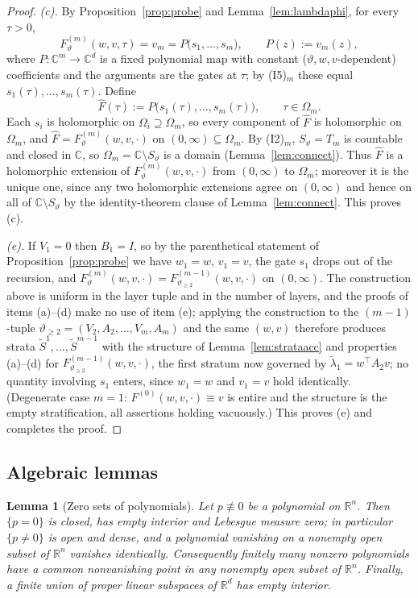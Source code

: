 \documentclass[11pt]{article}
\newtheorem{lemma}[theorem]{Lemma}
\theoremstyle{definition}
\theoremstyle{remark}
\theoremstyle{plain}
\newcommand{\R}{\mathbb{R}}
\newcommand{\C}{\mathbb{C}}
\begin{document}
\begin{proof}
\emph{(c).}  By Proposition~\ref{prop:probe} and Lemma~\ref{lem:lambdaphi}, for every
$\tau>0$,
\[
F^{(m)}_\vartheta(w,v,\tau)=v_m=P\bigl(s_1,\dots,s_m\bigr),\qquad P(z):=v_m(z),
\]
where $P:\C^m\to\C^d$ is a fixed polynomial map with constant
($\vartheta,w,v$-dependent) coefficients and the arguments are the gates at $\tau$; by
(I5)$_m$ these equal $s_1(\tau),\dots,s_m(\tau)$.  Define
\[
\widehat F(\tau):=P\bigl(s_1(\tau),\dots,s_m(\tau)\bigr),\qquad \tau\in\Omega_m .
\]
Each $s_i$ is holomorphic on $\Omega_i\supseteq\Omega_m$, so every component of
$\widehat F$ is holomorphic on $\Omega_m$, and
$\widehat F=F^{(m)}_\vartheta(w,v,\cdot)$ on $(0,\infty)\subseteq\Omega_m$.  By
(I2)$_m$, $S_\vartheta=T_m$ is countable and closed in $\C$, so
$\Omega_m=\C\setminus S_\vartheta$ is a domain (Lemma~\ref{lem:connect}).  Thus
$\widehat F$ is a holomorphic extension of $F^{(m)}_\vartheta(w,v,\cdot)$ from
$(0,\infty)$ to $\Omega_m$; moreover it is the unique one, since any two holomorphic
extensions agree on $(0,\infty)$ and hence on all of $\C\setminus S_\vartheta$ by the
identity-theorem clause of Lemma~\ref{lem:connect}.  This proves (c).

\emph{(e).}  If $V_1=0$ then $B_1=I$, so by the parenthetical statement of
Proposition~\ref{prop:probe} we have $w_1=w$, $v_1=v$, the gate $s_1$ drops out of the
recursion, and $F^{(m)}_\vartheta(w,v,\cdot)=F^{(m-1)}_{\vartheta_{\ge2}}(w,v,\cdot)$ on
$(0,\infty)$.  The construction above is uniform in the layer tuple and in the number of
layers, and the proofs of items (a)--(d) make no use of item (e); applying the
construction to the $(m-1)$-tuple $\vartheta_{\ge2}=(V_2,A_2,\dots,V_m,A_m)$ and the same
$(w,v)$ therefore produces strata $\widetilde S^1,\dots,\widetilde S^{m-1}$ with the
structure of Lemma~\ref{lem:strataacc} and properties (a)--(d) for
$F^{(m-1)}_{\vartheta_{\ge2}}(w,v,\cdot)$, the first stratum now governed by
$\widetilde\lambda_1=w^\top A_2v$; no quantity involving $s_1$ enters, since $w_1=w$ and
$v_1=v$ hold identically.  (Degenerate case $m=1$: $F^{(0)}(w,v,\cdot)\equiv v$ is entire
and the structure is the empty stratification, all assertions holding vacuously.)  This
proves (e) and completes the proof.
\end{proof}

\subsection{Algebraic lemmas}

\begin{lemma}[Zero sets of polynomials]\label{lem:zariski}
Let $p\not\equiv0$ be a polynomial on $\R^n$.  Then $\{p=0\}$ is closed, has empty
interior and Lebesgue measure zero; in particular $\{p\neq0\}$ is open and dense, and a
polynomial vanishing on a nonempty open subset of $\R^n$ vanishes identically.
Consequently finitely many nonzero polynomials have a common nonvanishing point in any
nonempty open subset of $\R^n$.  Finally, a finite union of proper linear subspaces of
$\R^d$ has empty interior.
\end{lemma}
\end{document}
